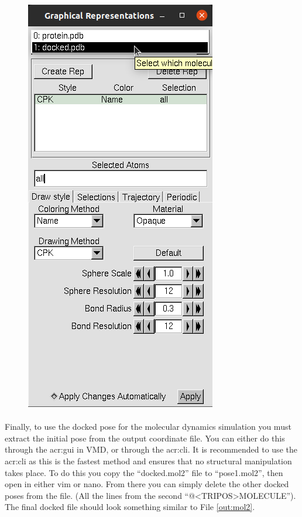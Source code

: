 \begin{figure}[H]
\begin{minipage}{0.45\textwidth}
            \includegraphics[height=0.5\textheight]{Graphics/ScreenShots/docked.png}
            \label{fig:dockRep}
        \end{minipage}
    \end{figure}

    \paragraph{}
        Finally, to use the docked pose for the molecular dynamics simulation you must extract the initial pose from the output coordinate file. You can either do this through the \gls{acr:gui} in VMD, or through the \gls{acr:cli}. It is recommended to use the \gls{acr:cli} as this is the fastest method and ensures that no structural manipulation takes place. To do this you copy the \enquote{docked.mol2} file to \enquote{pose\textunderscore 1.mol2}, then open in either vim or nano. From there you can simply delete the other docked poses from the file. (All the lines from the second \enquote{@<TRIPOS>MOLECULE}). The final docked file should look something similar to File \ref{out:mol2}.

